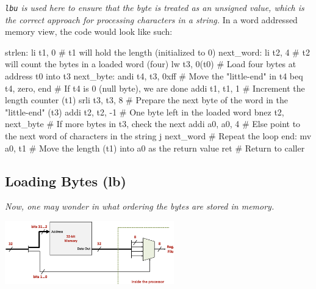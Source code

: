 \textit{\texttt{lbu} is used here to ensure that the byte is treated as an unsigned value, which is the correct approach for processing characters in a string.
}
In a word addressed memory view, the code would look like such: \\ \vspace*{5px}
\begin{center}
\begin{assembly}
strlen:
    li t1, 0           # t1 will hold the length (initialized to 0)
next_word:
    li t2, 4           # t2 will count the bytes in a loaded word (four)
    lw t3, 0(t0)       # Load four bytes at address t0 into t3
next_byte:
    andi t4, t3, 0xff  # Move the "little-end" in t4
    beq t4, zero, end  # If t4 is 0 (null byte), we are done
    addi t1, t1, 1     # Increment the length counter (t1)
    srli t3, t3, 8     # Prepare the next byte of the word in the "little-end" (t3)
    addi t2, t2, -1    # One byte left in the loaded word
    bnez t2, next_byte # If more bytes in t3, check the next
    addi a0, a0, 4     # Else point to the next word of characters in the string
    j next_word        # Repeat the loop
end:
    mv a0, t1          # Move the length (t1) into a0 as the return value
    ret                # Return to caller
\end{assembly}
\end{center}
\subsection{Loading Bytes (lb)}
\textit{Now, one may wonder in what ordering the bytes are stored in memory.} \\ \vspace*{5px}
\begin{center}
    \includegraphics[width=0.55\textwidth]{chapters/chapter1c/images/lb.png}
\end{center}
